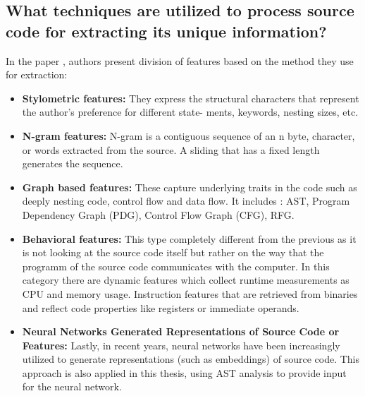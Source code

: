 \documentclass[10pt,english,a4paper]{report}
\begin{document}
\subsection{What techniques are utilized to process source code for extracting its unique information?}

In the paper \cite{information}, authors present division of features based on the method they use for extraction: 

\begin{itemize}
    \item \textbf{Stylometric features:} 
    They express the structural characters that represent the author’s preference for different state- ments, keywords, nesting sizes, etc.
    \item \textbf{N-gram features:}
    N-gram is a contiguous sequence of an n byte, character, or words extracted from the source. A sliding that has a fixed length generates 
    the sequence.
    \item \textbf{Graph based features:}
    These capture underlying traits in the code such as deeply nesting code, control flow and data flow.
    It includes : AST, Program Dependency Graph (PDG), Control Flow Graph (CFG), RFG.
    \item \textbf{Behavioral features:}
    This type completely different from the previous as it is not looking at the source code itself
    but rather on the way that the programm of the source code communicates with the computer.
    In this category there are dynamic features which collect runtime measurements as CPU and memory usage.
    Instruction features that are retrieved from binaries and reflect code properties like registers or immediate operands.
    \item \textbf{Neural Networks Generated Representations of Source Code or Features:}
    Lastly, in recent years, neural networks have been increasingly utilized 
    to generate representations (such as embeddings) of source code. This 
    approach is also applied in this thesis, using AST analysis to provide 
    input for the neural network.

\end{itemize}
\end{document}
